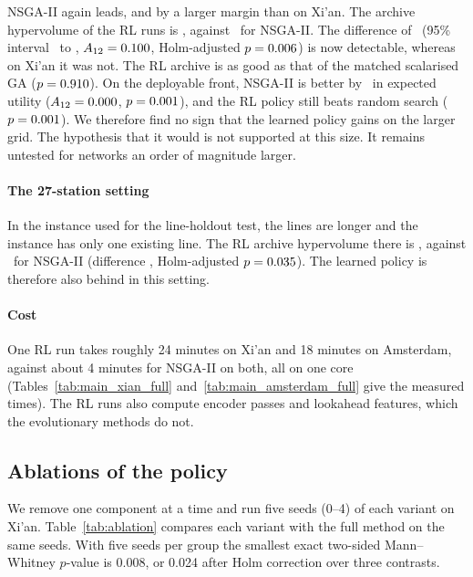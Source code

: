 

NSGA-II again leads, and by a larger margin than on Xi'an. The archive hypervolume of the RL runs is \AmsterdamRLArchHv, against \AmsterdamNSGAArchHv\ for NSGA-II. The difference of \AmsterdamRLvsNSGAArchHvDiff\ (95\% interval \AmsterdamRLvsNSGAArchHvDiffLo\ to \AmsterdamRLvsNSGAArchHvDiffHi, $A_{12}=0.100$, Holm-adjusted $p=0.006$) is now detectable, whereas on Xi'an it was not. The RL archive is as good as that of the matched scalarised GA ($p=0.910$). On the deployable front, NSGA-II is better by \AmsterdamRLvsNSGAPolicyEumDiff\ in expected utility ($A_{12}=0.000$, $p=0.001$), and the RL policy still beats random search ($p=0.001$). We therefore find no sign that the learned policy gains on the larger grid. The hypothesis that it would is not supported at this size. It remains untested for networks an order of magnitude larger.

\paragraph{The 27-station setting} In the instance used for the line-holdout test, the lines are longer and the instance has only one existing line. The RL archive hypervolume there is \XianLineOneOnlyRLArchHv, against \XianLineOneOnlyNSGAArchHv\ for NSGA-II (difference \XianLineOneOnlyRLvsNSGAArchHvDiff, Holm-adjusted $p=0.035$). The learned policy is therefore also behind in this setting.

\paragraph{Cost} One RL run takes roughly 24 minutes on Xi'an and 18 minutes on Amsterdam, against about 4 minutes for NSGA-II on both, all on one core (Tables~\ref{tab:main_xian_full} and~\ref{tab:main_amsterdam_full} give the measured times). The RL runs also compute encoder passes and lookahead features, which the evolutionary methods do not.

\subsection{Ablations of the policy}\label{sec:res-ablation}
We remove one component at a time and run five seeds (0--4) of each variant on Xi'an. Table~\ref{tab:ablation} compares each variant with the full method on the same seeds. With five seeds per group the smallest exact two-sided Mann--Whitney $p$-value is 0.008, or 0.024 after Holm correction over three contrasts.

